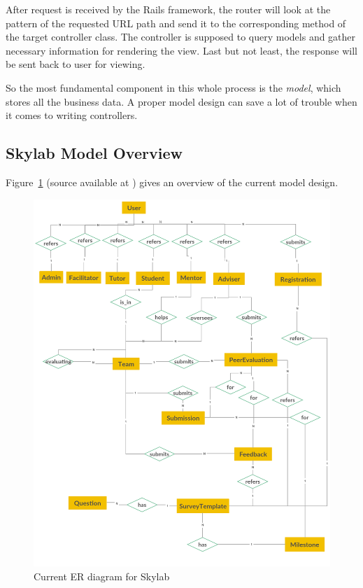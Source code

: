 After request is received by the Rails framework, the router will look at the pattern of the requested URL path and send it to the corresponding method of the target controller class. The controller is supposed to query models and gather necessary information for rendering the view. Last but not least, the response will be sent back to user for viewing.

So the most fundamental component in this whole process is the {\it model}, which stores all the business data. A proper model design can save a lot of trouble when it comes to writing controllers.

\subsection{Skylab Model Overview}

Figure~\ref{fig:SkylabER} (source available at \cite{citationERSource}) gives an overview of the current model design.

\begin{figure}[h]
  \centering
  \includegraphics[width=\textwidth]{Images/Skylab_ER.png}
  \caption{Current ER diagram for Skylab}
  \label{fig:SkylabER}
\end{figure}

